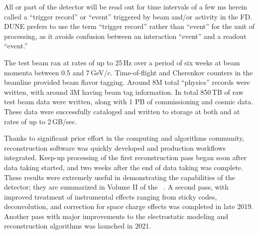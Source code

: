 \documentclass[../main-v1.tex]{subfiles}
\begin{document}

All or part of the detector will be read out for time intervals of a few ms herein called a ``trigger record'' or ``event'' triggered by beam and/or activity in the FD.
DUNE prefers to use the term ``trigger record'' rather than ``event'' for the unit of processing, as it avoids confusion between an interaction ``event'' and a readout ``event.''  


The  test beam ran at rates of up to 25\,Hz over a period of six weeks at beam momenta between 0.5 and 7\,GeV/c.  Time-of-flight and Cherenkov counters in the beamline provided beam flavor tagging.  Around 8M total ``physics'' records were written, with around 3M having beam tag information.  In total  850\,TB of raw test beam data were written, along with 1 PB of commissioning and cosmic data. These data were successfully cataloged and written to storage at both  and  at rates of up to 2\,GB/sec.   

Thanks to significant prior effort in the  %
computing and algorithms community, reconstruction software was quickly developed and production workflows integrated. Keep-up processing of the first reconstruction pass began soon after data taking started, and two weeks after the end of data taking was complete.  These results were extremely useful in demonstrating the capabilities of the detector; they are summarized in Volume II of the  ~\cite{Abi:2020evt}.  A second pass, with improved treatment of instrumental effects ranging from sticky codes, \twod deconvolution, and correction for space charge effects was completed in late 2019. Another pass with major improvements to the electrostatic modeling and reconstruction algorithms was launched in 2021. 
\end{document}
